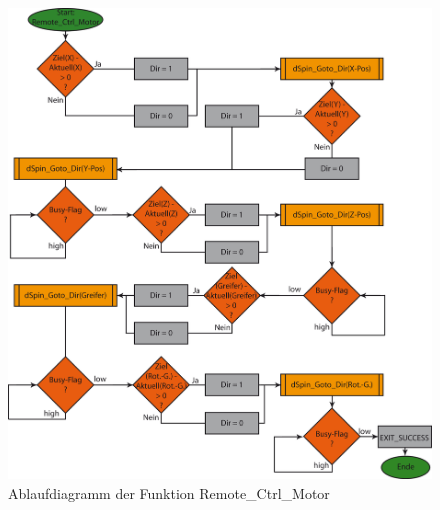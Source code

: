 \begin{figure}[h]
\includegraphics[scale = 0.8]{./Remote_Control_Motor.png}
\hspace{-14pt}
\caption{Ablaufdiagramm der Funktion Remote\_Ctrl\_Motor}
\end{figure} 

